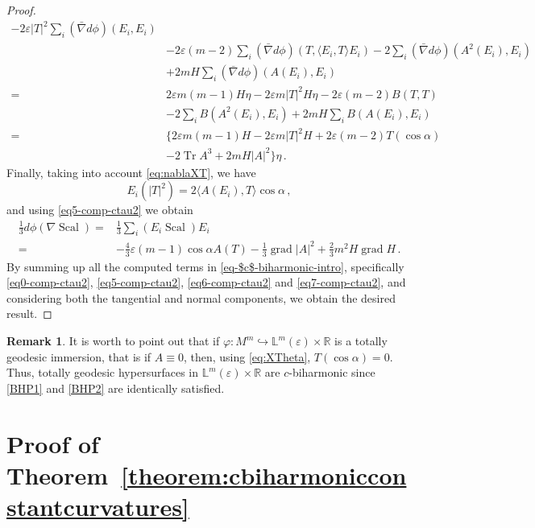 \documentclass[11pt,leqno]{amsart}
\theoremstyle{plain}
\theoremstyle{definition}
\newtheorem{remark}       [theorem]  {Remark}
\numberwithin{equation}{section}
\newcommand{\Scal}{\operatorname{Scal}}
\DeclareMathOperator{\grad}{grad}
\DeclareMathOperator{\trace}{Tr}
\numberwithin{equation}{section}
\begin{document}
{\begin{proof}
\begin{align}
 -2 \varepsilon |T|^2 \sum_i(\bar \nabla d\phi)(E_i,E_i)\nonumber\\
 & -2 \varepsilon(m-2) \sum_i(\bar \nabla d\phi)(T,\langle E_i, T\rangle E_i)- 2  \sum_i(\bar \nabla d\phi)(A^2(E_i),E_i)\nonumber\\
 & + 2 m H  \sum_i(\bar \nabla d\phi)(A(E_i),E_i)\nonumber\\
 =& 2 \varepsilon m (m-1) H \eta - 2 \varepsilon m |T|^2  H \eta - 2 \varepsilon (m-2) B(T,T)\nonumber\\
 &-2 \sum_i B(A^2(E_i),E_i)+2 m H \sum_i B(A(E_i),E_i)\nonumber\\
 =&\big\{ 2 \varepsilon m(m-1) H -2 \varepsilon m |T|^2 H+ 2 \varepsilon (m-2) T(\cos\alpha)\nonumber\\
 & -2 \trace A^3+2m H |A|^2\big\}\eta\,.
\end{align}
Finally, taking into account \eqref{eq:nablaXT}, we have 
$$
E_i (|T|^2) = 2  \langle A(E_i),T\rangle \cos\alpha\,,
$$
and using \eqref{eq5-comp-ctau2} we obtain
\begin{align}\label{eq7-comp-ctau2}
\frac{1}{3} d\phi (\nabla\Scal)=&\frac{1}{3} \sum_i (E_i\Scal)E_i\nonumber\\
=&-\frac{4}{3} \varepsilon (m-1) \cos\alpha A(T)-\frac{1}{3} \grad |A|^2+\frac{2}{3} m^2 H \grad H\,.
\end{align}
By summing up all the computed terms in \eqref{eq-$c$-biharmonic-intro}, specifically \eqref{eq0-comp-ctau2}, \eqref{eq5-comp-ctau2}, \eqref{eq6-comp-ctau2} and \eqref{eq7-comp-ctau2}, and considering both the tangential and normal components, we obtain the desired result.

\end{proof}


\begin{remark}
It is worth to point out that if $\varphi:M^{m}\hookrightarrow {\mathbb L}^m(\varepsilon)\times \mathbb{R}$ is a totally geodesic immersion, that is if $A\equiv 0$, then, using \eqref{eq:XTheta}, $T(\cos\alpha)=0$. Thus, totally geodesic hypersurfaces in ${\mathbb L}^m(\varepsilon)\times \mathbb{R}$ are $c$-biharmonic since \eqref{BHP1} and  \eqref{BHP2} are identically satisfied.
\end{remark}



\section{Proof of Theorem~\ref{theorem:cbiharmonicconstantcurvatures}}\label{sec-proofTh1}

}
\end{document}
